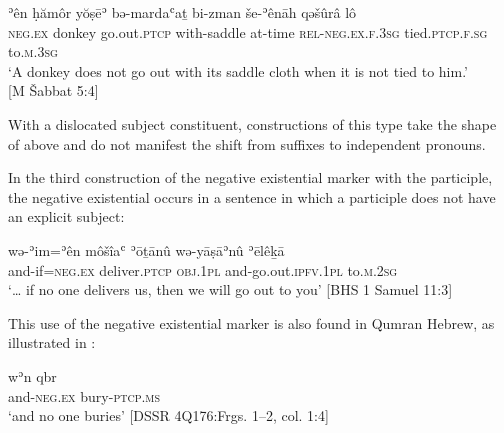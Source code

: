 \documentclass[output=paper,colorlinks,citecolor=brown,draft,draftmode]{langscibook}
\begin{document}
 \begin{exe}
 \ex \label{ex:heb-donkey}
\gll ʾên ḥămôr yŏṣēʾ bə-mardaʿaṯ bi-zman še-ʾênāh qəšûrâ lô \\
\textsc{neg.ex} donkey go.out.\textsc{ptcp}   with-saddle      at-time    \textsc{rel}-\textsc{neg.ex.f.3sg} tied.\textsc{ptcp.f.sg}   to.\textsc{m.3sg} \\
\glt `A donkey does not go out with its saddle cloth when it is not tied to   him.'\\ [M Šabbat 5:4]
\end{exe}
%

With a dislocated subject constituent, constructions of this type take the
shape of  above and do not manifest the shift from suffixes to independent pronouns.

In the third construction of the negative existential marker with the
participle, the negative existential occurs in a sentence in which a
participle does not have an explicit subject:
%
\begin{exe}\ex \label{ex:heb-deliver}
    \gll wə-ʾim=ʾên môšîaʿ ʾōṯānû wə-yāṣāʾnû ʾēlêḵā          
    \\ and-if=\textsc{neg.ex}   deliver.\textsc{ptcp} \textsc{obj.1pl}
    and-go.out.\textsc{ipfv.1pl}  to.\textsc{m.2sg}  \\
    \glt `\ldots{} if no one delivers us, then we will go out to you'
    [BHS 1 Samuel 11:3]
    \end{exe}
%
This use of the negative existential marker is also found in Qumran Hebrew,
as illustrated in :
%
\begin{exe}\ex \label{ex:heb-bury}
    \gll wʾn qbr   \\
  and-\textsc{neg.ex}    bury-\textsc{ptcp.ms} \\
    \glt `and no one buries' [DSSR 4Q176:Frgs. 1--2, col.
    1:4]
    \end{exe}
\end{document}
